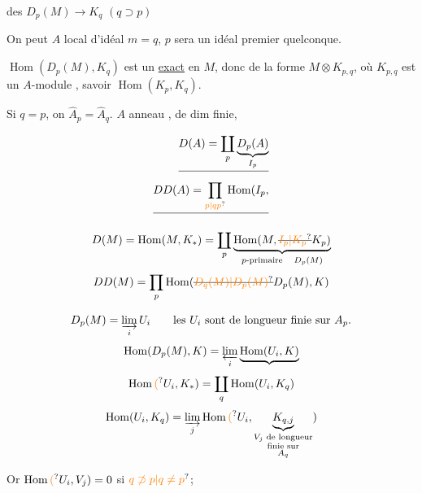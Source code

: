  des  $D_p(M)\longrightarrow K_q$ $(q\supset p)$

On peut  $A$ local d'idéal  $m=q$, $p$ sera un idéal premier quelconque.

 $\operatorname{Hom}(D_p(M),K_q)$ est un  \uline{exact} en $M$, donc de la forme $M\otimes K_{p,q}$, où $K_{p,q}$ est un $A$-module  , savoir $\operatorname{Hom}(K_p,K_q)$.

Si $q=p$, on  $\widehat A_p=\widehat A_q$.
$A$ anneau , de dim finie, 

\[
\begin{aligned}
\deleted{D(A)=\coprod_p\underbrace{D_p(A)}_{I_p}}\\
\deleted{DD(A)=\prod_{\unsure{p|qp}}\operatorname{Hom}(I_p,}
\end{aligned}
\]

\[
D(M)=\operatorname{Hom}(M,K_*)=\coprod_p
\underbrace{\operatorname{Hom}(M,\deleted{\unsure{I_p|K_p}}K_p)}_{p\text{-primaire}\quad D_p(M)}
\]
\[
DD(M)=\prod_p\operatorname{Hom}(\deleted{\unsure{D_q(M)|D_p(M)}}D_p(M),K)
\]

\[
D_p(M)=\varinjlim_i U_i
\qquad\text{les $U_i$ sont de longueur finie sur $A_p$.}
\]
\[
\operatorname{Hom}(D_p(M),K)=\varprojlim_i\underbrace{\operatorname{Hom}(U_i,K)}
\]
\[
\operatorname{Hom}\unsure{(}U_i,K_*)=\coprod_q\operatorname{Hom}(U_i,K_q)
\]
\[
\operatorname{Hom}(U_i,K_q)=\varinjlim_j\operatorname{Hom}\unsure{(}U_i,
\underbrace{K_{q,j}}_{\substack{V_j\text{ de longueur}\\\text{finie sur}\\A_q}})
\]


Or $\operatorname{Hom}\unsure{(}U_i,V_j)=0$ si $\unsure{q\not\supset p|q\ne p}$;


